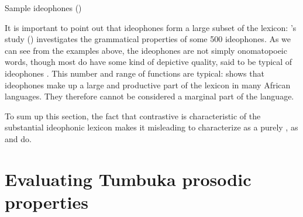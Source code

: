 \documentclass[output=paper
,newtxmath
,modfonts
,nonflat]{langsci/langscibook}
\begin{document}
\ea\label{ex:downing:6} Sample  ideophones (\citet[154-155]{Mphande1989})
\ea\label{ex:downing:6a}
\ex\label{ex:downing:6b}
\ex\label{ex:downing:6c}
\ex\label{ex:downing:6d}
\ex\label{ex:downing:6e}
\ex\label{ex:downing:6f}
\ex\label{ex:downing:6g}
\ex\label{ex:downing:6h}
\ex\label{ex:downing:6i}
\ex\label{ex:downing:6j}
\ex\label{ex:downing:6k}
\ex\label{ex:downing:6l}
\ex\label{ex:downing:6m}
\ex\label{ex:downing:6n}
\ex\label{ex:downing:6o}
\ex\label{ex:downing:6p}
\ex\label{ex:downing:6q}
\ex\label{ex:downing:6r}
\z
\z

It is important to point out that ideophones form a large subset of the lexicon: \citeauthor{Mphande1989}’s study (\citeyear{Mphande1989}) investigates the grammatical properties of some 500  ideophones. As we can see from the examples above, the ideophones are not simply onomatopoeic words, though most do have some kind of depictive quality, said to be typical of ideophones \citep{Dingemanse2012}. This number and range of functions are typical: \citet[179]{childs1994} shows that ideophones make up a large and productive part of the lexicon in many African languages. They therefore cannot be considered a marginal part of the language. 

To sum up this section, the fact that contrastive  is characteristic of the substantial ideophonic lexicon makes it misleading to characterize  as a purely , as \citet{Kisseberth&Odden2003} and \citet{Vail1972} do.

\section{Evaluating Tumbuka prosodic properties}\label{sec:downing:3}
\end{document}
